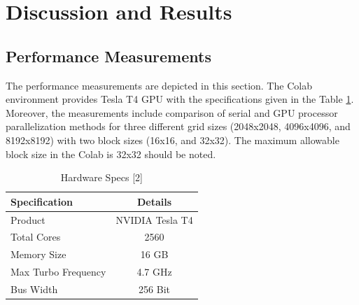 \documentclass[12pt]{article}
\begin{document}
\section{Discussion and Results}
\subsection{Performance Measurements}

The performance measurements are depicted in this section. The Colab environment provides Tesla T4 GPU with the specifications given in the Table \ref{tab:spec}. Moreover, the measurements include comparison of serial and GPU processor parallelization methods for three different grid sizes (2048x2048, 4096x4096, and 8192x8192) with two block sizes (16x16, and 32x32). The maximum allowable block size in the Colab is 32x32 should be noted.

\begin{table}[H]
\centering
\caption{Hardware Specs [2]}
\label{tab:spec}
\begin{tabular}{lc}
\toprule
\textbf{Specification} & \textbf{Details} \\
\midrule
Product & NVIDIA Tesla T4 \\
Total Cores & 2560 \\
Memory Size & 16 GB\\
Max Turbo Frequency & 4.7 GHz \\
Bus Width & 256 Bit \\
\bottomrule
\end{tabular}
\end{table}
\end{document}
